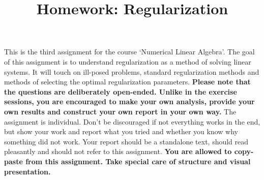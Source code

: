 \documentclass[12pt]{article}
\title{Homework: Regularization} %
\begin{document}
\maketitle
This is the third assignment for the course ‘Numerical Linear Algebra’. The goal of this assignment is to understand regularization as a method of solving linear systems. It will touch on ill-posed problems, standard regularization methods and methods of selecting the optimal regularization parameters. \textbf{Please note that the questions are deliberately open-ended. Unlike in the exercise
sessions, you are encouraged to make your own analysis, provide your own results and construct your own report in your own way.} The assignment is individual.
Don’t be discouraged if not everything works in the end, but show your work and report what you tried and whether you know why something did not work.
Your report should be a standalone text, should read pleasantly and should not refer to this assignment. \textbf{You are allowed to copy-paste from this assignment. Take special care of structure and visual presentation.}

\end{document}
